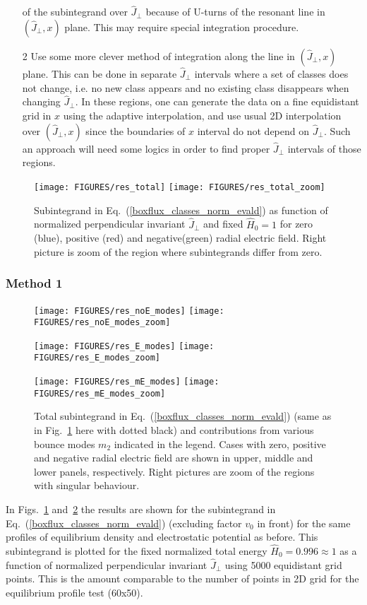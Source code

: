 \documentclass[preprint,prb,aps]{revtex4-1}
\newcommand{\eq}[1]{(\ref{#1})}
\begin{document}
\begin{itemize}
of the subintegrand over $\hat J_\perp$ because of U-turns of the resonant line
in $(\hat J_\perp,x)$ plane. This may require special integration procedure.
\item[2]
Use some more clever method of integration along the line in $(\hat J_\perp,x)$ plane.
This can be done in separate $\hat J_\perp$ intervals where a set of classes does not 
change, i.e. no new class appears and no existing class disappears when changing
$\hat J_\perp$. 
In these regions, one can generate the data on a fine equidistant grid 
in $x$ using the adaptive interpolation, and use usual 2D interpolation over
$(\hat J_\perp,x)$ since the boundaries of $x$ interval do not depend on 
$\hat J_\perp$. Such an approach will need some logics in order to find proper
$\hat J_\perp$ intervals of those regions.

\end{itemize}
%
\begin{figure}[ht]
\centerline{
\texttt{[image: FIGURES/res\_total]}
\texttt{[image: FIGURES/res\_total\_zoom]}
}
\caption[]{
Subintegrand in Eq.~\eq{boxflux_classes_norm_evald} as function of normalized
perpendicular invariant $\hat J_\perp$ and fixed $\hat H_0=1$ 
for zero (blue), positive (red) and 
negative(green) radial electric field. Right picture is zoom of the region where
subintegrands differ from zero.
}
\label{fig:restot}
\end{figure}

\subsubsection{Method 1}
\label{sssec:one}
%
%
\begin{figure}[ht]
\centerline{
\texttt{[image: FIGURES/res\_noE\_modes]}
\texttt{[image: FIGURES/res\_noE\_modes\_zoom]}
}
\centerline{
\texttt{[image: FIGURES/res\_E\_modes]}
\texttt{[image: FIGURES/res\_E\_modes\_zoom]}
}
\centerline{
\texttt{[image: FIGURES/res\_mE\_modes]}
\texttt{[image: FIGURES/res\_mE\_modes\_zoom]}
}
\caption[]{
Total subintegrand in Eq.~\eq{boxflux_classes_norm_evald} 
(same as in Fig.~\ref{fig:restot} here with dotted black) and contributions
from various bounce modes $m_2$ indicated in the legend.
Cases with zero, positive and negative radial electric field are shown in upper,
middle and lower panels, respectively. Right pictures are zoom of the 
regions with singular behaviour.
}
\label{fig:restot_modes}
\end{figure}
%
%
In Figs.~\ref{fig:restot} and~\ref{fig:restot_modes} the results are shown for the
subintegrand in Eq.~\eq{boxflux_classes_norm_evald} (excluding factor $v_0$ in front)
for the same profiles of equilibrium density and electrostatic potential as before.
This subintegrand is plotted for the fixed normalized total energy 
$\hat H_0 = 0.996 \approx 1$ as a function of normalized perpendicular invariant
$\hat J_\perp$ using 5000 equidistant grid points. This is the amount comparable
to the number of points in 2D grid for the equilibrium profile test (60x50).
\end{document}
